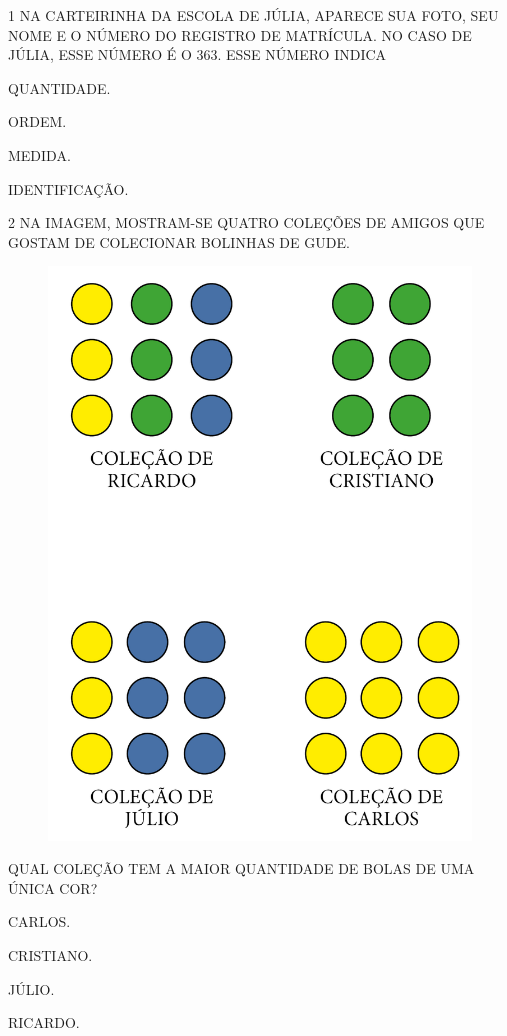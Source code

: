 
\num{1} NA CARTEIRINHA DA ESCOLA DE JÚLIA, APARECE SUA FOTO, SEU NOME E O NÚMERO DO
REGISTRO DE MATRÍCULA. NO CASO DE JÚLIA, ESSE NÚMERO É O 363. ESSE NÚMERO INDICA

\begin{escolha}
\item
  QUANTIDADE.
\item
  ORDEM.
\item
  MEDIDA.
\item
  IDENTIFICAÇÃO.
\end{escolha}



\num{2} NA IMAGEM, MOSTRAM-SE QUATRO COLEÇÕES DE AMIGOS QUE GOSTAM DE COLECIONAR
BOLINHAS DE GUDE.

\begin{figure}[htpb!]
\centering
\includegraphics[width=.5\textwidth]{../ilustracoes/MAT1/SAEB_1ANO_MAT_FIGURA16.png}
\end{figure}

\pagebreak
\noindent{}QUAL COLEÇÃO TEM A MAIOR QUANTIDADE DE BOLAS DE UMA ÚNICA COR?

\begin{escolha}
\item
  CARLOS.
\item
  CRISTIANO.
\item
  JÚLIO.
\item
  RICARDO.
\end{escolha}

